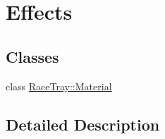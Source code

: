 \hypertarget{group___effects}{\section{Effects}
\label{group___effects}
}
\subsection*{Classes}
\begin{DoxyCompactItemize}
\item 
class \hyperlink{class_race_tray_1_1_material}{Race\-Tray\-::\-Material}
\end{DoxyCompactItemize}


\subsection{Detailed Description}
